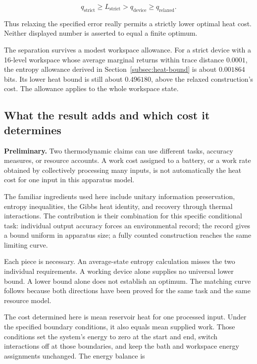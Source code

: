 \documentclass[11pt,letterpaper]{article}
\begin{document}
\[q_{\mathrm{strict}} \geq L_{\mathrm{strict}} > q_{\mathrm{device}} \geq q_{\mathrm{relaxed}}.\]

Thus relaxing the specified error really permits a strictly lower optimal heat cost. Neither displayed number is asserted to equal a finite optimum.

The separation survives a modest workspace allowance. For a strict device with a 16-level workspace whose average marginal returns within trace distance \(0.0001\), the entropy allowance derived in Section~\ref{subsec:heat-bound} is about \(0.001864\) bits. Its lower heat bound is still about \(0.496180\), above the relaxed construction's cost. The allowance applies to the whole workspace state.

\subsection{What the result adds and which cost it determines}\label{subsec:contribution}

\textbf{Preliminary.} Two thermodynamic claims can use different tasks, accuracy measures, or resource accounts. A work cost assigned to a battery, or a work rate obtained by collectively processing many inputs, is not automatically the heat cost for one input in this apparatus model.

The familiar ingredients used here include unitary information preservation, entropy inequalities, the Gibbs heat identity, and recovery through thermal interactions. The contribution is their combination for this specific conditional task: individual output accuracy forces an environmental record; the record gives a bound uniform in apparatus size; a fully counted construction reaches the same limiting curve.

Each piece is necessary. An average-state entropy calculation misses the two individual requirements. A working device alone supplies no universal lower bound. A lower bound alone does not establish an optimum. The matching curve follows because both directions have been proved for the same task and the same resource model.

The cost determined here is mean reservoir heat for one processed input. Under the specified boundary conditions, it also equals mean supplied work. Those conditions set the system's energy to zero at the start and end, switch interactions off at those boundaries, and keep the bath and workspace energy assignments unchanged. The energy balance is
\end{document}
